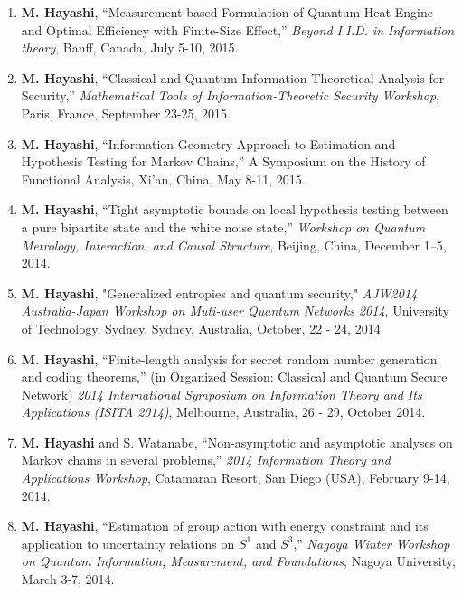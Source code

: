 \documentclass[a4paper,12pt,oneside]{article}
\begin{document}
\begin{enumerate}
\item 
\textbf{M. Hayashi}, ``Measurement-based Formulation of Quantum Heat Engine and Optimal Efficiency with Finite-Size Effect,'' 
{\em Beyond I.I.D. in Information theory}, Banff, Canada, July 5-10, 2015.

\item 
\textbf{M. Hayashi}, ``Classical and Quantum Information Theoretical Analysis for Security,'' 
{\em Mathematical Tools of Information-Theoretic Security Workshop}, Paris, France, September 23-25, 2015.



\item 
\textbf{M. Hayashi},
``Information Geometry Approach to Estimation and Hypothesis Testing for Markov Chains,'' 
A Symposium on the History of Functional Analysis, Xi'an, 
China, May 8-11, 2015. 

\item 
\textbf{M. Hayashi}, 
``Tight asymptotic bounds on local hypothesis testing between a pure bipartite state and the white noise state,''
{\em Workshop on Quantum Metrology, Interaction, and Causal Structure},
Beijing, China, December 1--5, 2014. 

\item 
\textbf{M. Hayashi}, 
"Generalized entropies and quantum security," 
{\em AJW2014 Australia-Japan Workshop on Muti-user Quantum Networks 2014}, University of Technology, Sydney, Sydney, Australia, 
October, 22 - 24, 2014

\item 
\textbf{M. Hayashi},
``Finite-length analysis for secret random number generation and coding theorems,'' 
(in Organized Session: Classical and Quantum Secure Network) 
{\em 2014 International Symposium on Information Theory and Its Applications (ISITA 2014)}, Melbourne, Australia, 26 - 29, October 2014.

\item 
\textbf{M. Hayashi} and S. Watanabe, 
``Non-asymptotic and asymptotic analyses on Markov chains in several problems,'' 
{\em 2014 Information Theory and Applications Workshop}, 
Catamaran Resort, San Diego (USA), February 9-14, 2014.

\item 
\textbf{M. Hayashi}, 
``Estimation of group action with energy constraint and its application to uncertainty relations on $S^1$ and $S^3$,'' 
{\em Nagoya Winter Workshop on Quantum Information, Measurement, and Foundations}, 
Nagoya University, March 3-7, 2014.


\end{enumerate}
\end{document}
